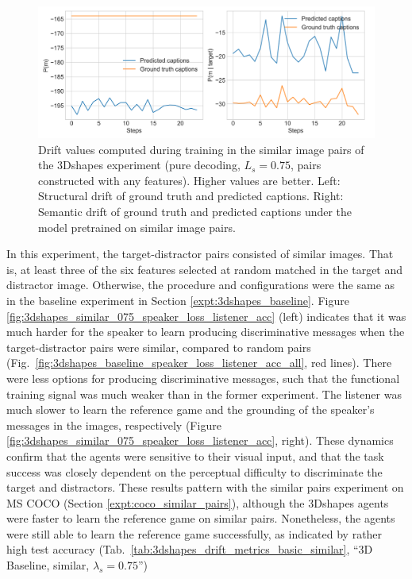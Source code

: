 \begin{figure}[h]
	\centering
	\includegraphics[width=\linewidth]{images/3dshapes_structural_semantic_drift_4000_pure_075_similar.png}
	\caption{Drift values computed during training in the similar image pairs of the 3Dshapes experiment (pure decoding, $L_s = 0.75$, pairs constructed with any features). Higher values are better. Left: Structural drift of ground truth and predicted captions. Right: Semantic drift of ground truth and predicted captions under the model pretrained on similar image pairs.} 
	\label{fig:3dshapes_similar_075_str_sem_drift}
\end{figure}

In this experiment, the target-distractor pairs consisted of similar images. That is, at least three of the six features selected at random matched in the target and distractor image. Otherwise, the procedure and configurations were the same as in the baseline experiment in Section \ref{expt:3dshapes_baseline}. 
Figure \ref{fig:3dshapes_similar_075_speaker_loss_listener_acc} (left) indicates that it was much harder for the speaker to learn producing discriminative messages when the target-distractor pairs were similar, compared to random pairs (Fig.~\ref{fig:3dshapes_baseline_speaker_loss_listener_acc_all}, red lines). There were less options for producing discriminative messages, such that the functional training signal was much weaker than in the former experiment. The listener was much slower to learn the reference game and the grounding of the speaker's messages in the images, respectively (Figure \ref{fig:3dshapes_similar_075_speaker_loss_listener_acc}, right). These dynamics confirm that the agents were sensitive to their visual input, and that the task success was closely dependent on the perceptual difficulty to discriminate the target and distractors. These results pattern with the similar pairs experiment on MS COCO (Section \ref{expt:coco_similar_pairs}), although the 3Dshapes agents were faster to learn the reference game on similar pairs. Nonetheless, the agents were still able to learn the reference game successfully, as indicated by rather high test accuracy (Tab.~\ref{tab:3dshapes_drift_metrics_basic_similar}, ``3D Baseline, similar, $\lambda_s = 0.75$'')

